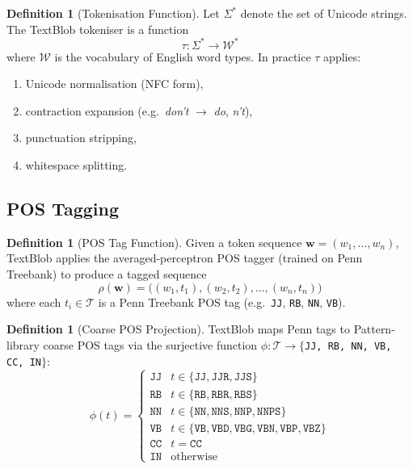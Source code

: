 \documentclass[12pt,a4paper]{article}
\theoremstyle{plain}
\theoremstyle{definition}
\newtheorem{definition}[theorem]{Definition}
\begin{document}
\begin{definition}[Tokenisation Function]
\label{def:tokenise}
  Let $\Sigma^*$ denote the set of Unicode strings.  The TextBlob
  tokeniser is a function
  \[
    \tau : \Sigma^* \to \mathcal{W}^*
  \]
  where $\mathcal{W}$ is the vocabulary of English word types.  In
  practice $\tau$ applies:
  \begin{enumerate}[label=(\roman*)]
    \item Unicode normalisation (NFC form),
    \item contraction expansion (e.g.\ \textit{don't}
          $\to$ \textit{do}, \textit{n't}),
    \item punctuation stripping,
    \item whitespace splitting.
  \end{enumerate}
\end{definition}

\subsection{POS Tagging}

\begin{definition}[POS Tag Function]
\label{def:pos}
  Given a token sequence $\mathbf{w} = (w_1,\ldots,w_n)$, TextBlob
  applies the averaged-perceptron POS tagger (trained on Penn Treebank)
  to produce a tagged sequence
  \[
    \rho(\mathbf{w}) =
    \bigl((w_1, t_1), (w_2, t_2), \ldots, (w_n, t_n)\bigr)
  \]
  where each $t_i \in \mathcal{T}$ is a Penn Treebank POS tag
  (e.g.\ \texttt{JJ}, \texttt{RB}, \texttt{NN}, \texttt{VB}).
\end{definition}

\begin{definition}[Coarse POS Projection]
\label{def:coarsepos}
  TextBlob maps Penn tags to Pattern-library coarse POS tags via the
  surjective function $\phi : \mathcal{T} \to \{$\texttt{JJ, RB, NN,
  VB, CC, IN}$\}$:
  \[
    \phi(t) =
    \begin{cases}
      \texttt{JJ} & t \in \{\texttt{JJ}, \texttt{JJR}, \texttt{JJS}\} \\
      \texttt{RB} & t \in \{\texttt{RB}, \texttt{RBR}, \texttt{RBS}\} \\
      \texttt{NN} & t \in \{\texttt{NN}, \texttt{NNS}, \texttt{NNP},
                             \texttt{NNPS}\} \\
      \texttt{VB} & t \in \{\texttt{VB}, \texttt{VBD}, \texttt{VBG},
                             \texttt{VBN}, \texttt{VBP}, \texttt{VBZ}\} \\
      \texttt{CC} & t = \texttt{CC} \\
      \texttt{IN} & \text{otherwise}
    \end{cases}
  \]
\end{definition}
\end{document}
